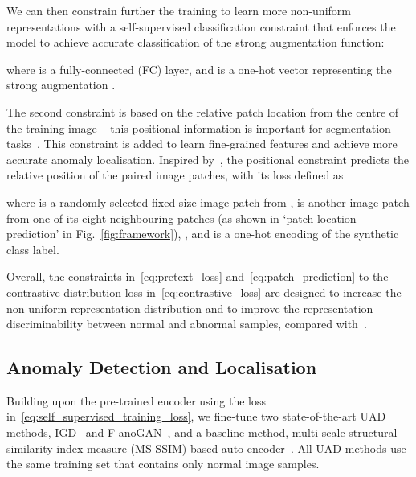 \documentclass[runningheads]{llncs}
\begin{document}
We can then constrain further the training to learn more non-uniform representations with a self-supervised classification constraint  that enforces the model to achieve accurate classification of the strong augmentation function:

where  is a fully-connected (FC) layer, and  is a one-hot vector representing the strong augmentation .

The second constraint is based on the relative patch location from the centre of the training image -- 
this positional information is important for segmentation tasks~\cite{noroozi2016unsupervised,DBLP:journals/corr/abs-1901-09005}. This constraint is added to learn fine-grained features and achieve more accurate anomaly localisation. Inspired by~\cite{doersch2015unsupervised}, the positional constraint predicts the relative position of the paired image patches, with its loss defined as 

where  is a randomly selected fixed-size image patch from ,  is another image patch from one of its eight neighbouring patches (as shown in `patch location prediction' in Fig.~\ref{fig:framework}), , 
and  is a one-hot encoding of the synthetic class label.


Overall, the constraints in~\eqref{eq:pretext_loss} and~\eqref{eq:patch_prediction} to the contrastive distribution loss in~\eqref{eq:contrastive_loss} are designed to increase the non-uniform representation distribution and to improve the representation discriminability between normal and abnormal samples, compared with~\cite{sohn2020learning}.
















\subsection{Anomaly Detection and Localisation}
\label{sec:anomaly_detection_localisation}

Building upon the pre-trained encoder  using the loss in~\eqref{eq:self_supervised_training_loss}, we fine-tune two state-of-the-art UAD methods, IGD~\cite{chen2021unsupervised} and F-anoGAN~\cite{F-anoGAN}, and a baseline method, multi-scale structural similarity index measure (MS-SSIM)-based auto-encoder~\cite{wang2003multiscale}.
All UAD methods use the same training set  that contains only normal image samples. 
\end{document}
